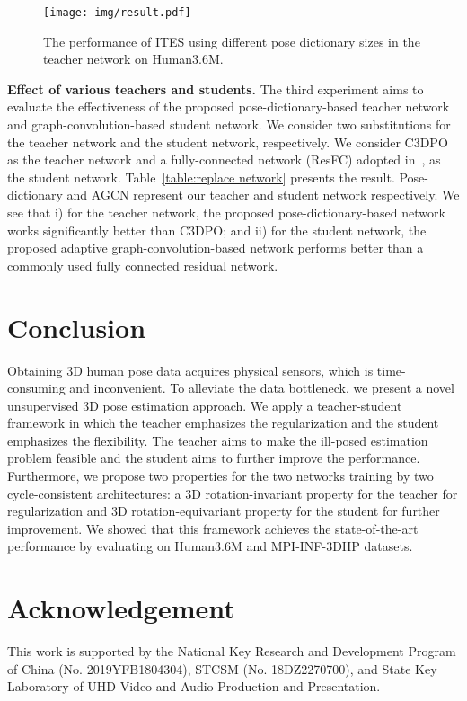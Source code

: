 \documentclass[letterpaper]{article} \usepackage{aaai21}  \usepackage{times}  \usepackage{helvet} \usepackage{courier}  \usepackage[hyphens]{url}  \usepackage{graphicx} \urlstyle{rm} \def\UrlFont{\rm}  \usepackage{natbib}  \usepackage{caption} \frenchspacing  \setlength{\pdfpagewidth}{8.5in}  \setlength{\pdfpageheight}{11in}
\begin{document}
\begin{figure}[t] 
\centering
\texttt{[image: img/result.pdf]} 
\vspace{-5mm}
\caption{\small The performance of ITES using different pose dictionary sizes in the teacher network on Human3.6M.}
\vspace{-5mm}
\label{fig:result}
\end{figure}

\noindent\textbf{Effect of various teachers and students.}
The third experiment aims to evaluate the effectiveness of the proposed pose-dictionary-based teacher network and graph-convolution-based student network. We consider two substitutions for the teacher network and the student network, respectively. We consider C3DPO~\cite{novotny2019c3dpo} as the teacher network and a fully-connected network (ResFC) adopted in~\cite{novotny2019c3dpo,chen2019unsupervised}, as the student network. Table~\ref{table:replace network} presents the result. Pose-dictionary and AGCN represent our teacher and student network respectively. We see that i) for the teacher network, the proposed pose-dictionary-based network works significantly better than C3DPO; and ii) for the student network, the proposed adaptive graph-convolution-based network performs better than a commonly used fully connected residual network.


\section{Conclusion}
Obtaining 3D human pose data acquires physical sensors, which is time-consuming and inconvenient. To alleviate the data bottleneck, we present a novel unsupervised 3D pose estimation approach. We apply a teacher-student 
framework in which the teacher emphasizes the regularization and the student emphasizes the flexibility. The teacher aims to make the ill-posed estimation problem feasible and the student aims to further improve the performance. Furthermore, we propose two properties for the two networks training by two cycle-consistent architectures: a 3D rotation-invariant property for the teacher for regularization and 3D rotation-equivariant property for the student for further improvement. We showed that this framework achieves the state-of-the-art performance by evaluating on Human3.6M and MPI-INF-3DHP datasets.

\section*{Acknowledgement}
This work is supported by the National Key Research and Development Program of China (No. 2019YFB1804304), STCSM (No. 18DZ2270700), and State Key Laboratory of UHD Video and Audio Production and Presentation.
\end{document}
